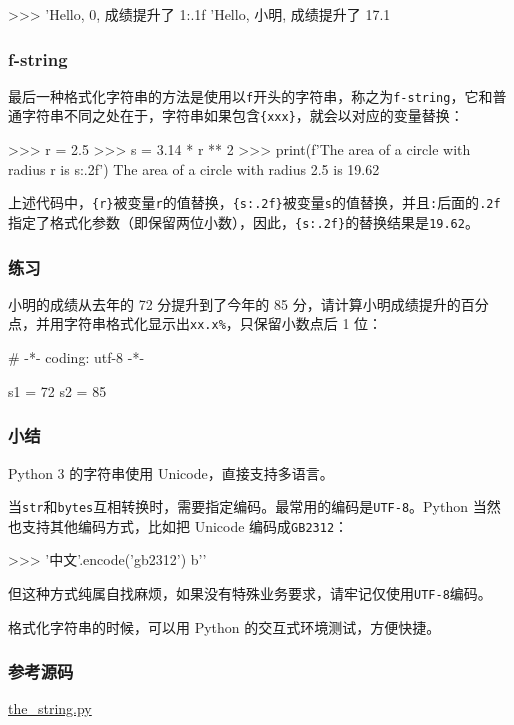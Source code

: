 \begin{pythoncode}
>>> 'Hello, {0}, 成绩提升了 {1:.1f}%
'Hello, 小明, 成绩提升了 17.1%
\end{pythoncode}

\hypertarget{f-string}{%
\subsubsection{f-string}\label{f-string}}

最后一种格式化字符串的方法是使用以\texttt{f}开头的字符串，称之为\texttt{f-string}，它和普通字符串不同之处在于，字符串如果包含\texttt{\{xxx\}}，就会以对应的变量替换：

\begin{pythoncode}
>>> r = 2.5
>>> s = 3.14 * r ** 2
>>> print(f'The area of a circle with radius {r} is {s:.2f}')
The area of a circle with radius 2.5 is 19.62
\end{pythoncode}

上述代码中，\texttt{\{r\}}被变量\texttt{r}的值替换，\texttt{\{s:.2f\}}被变量\texttt{s}的值替换，并且\texttt{:}后面的\texttt{.2f}指定了格式化参数（即保留两位小数），因此，\texttt{\{s:.2f\}}的替换结果是\texttt{19.62}。

\hypertarget{ux7ec3ux4e60}{%
\subsubsection{练习}\label{ux7ec3ux4e60}}

小明的成绩从去年的 72 分提升到了今年的 85
分，请计算小明成绩提升的百分点，并用字符串格式化显示出\texttt{\textquotesingle{}xx.x\%\textquotesingle{}}，只保留小数点后
1 位：

\begin{pythoncode}
# -*- coding: utf-8 -*-

s1 = 72
s2 = 85
\end{pythoncode}

\hypertarget{ux5c0fux7ed3}{%
\subsubsection{小结}\label{ux5c0fux7ed3}}

Python 3 的字符串使用 Unicode，直接支持多语言。

当\texttt{str}和\texttt{bytes}互相转换时，需要指定编码。最常用的编码是\texttt{UTF-8}。Python
当然也支持其他编码方式，比如把 Unicode 编码成\texttt{GB2312}：

\begin{pythoncode}
>>> '中文'.encode('gb2312')
b'\xce{}'
\end{pythoncode}

但这种方式纯属自找麻烦，如果没有特殊业务要求，请牢记仅使用\texttt{UTF-8}编码。

格式化字符串的时候，可以用 Python 的交互式环境测试，方便快捷。

\hypertarget{ux53c2ux8003ux6e90ux7801}{%
\subsubsection{参考源码}\label{ux53c2ux8003ux6e90ux7801}}

\href{https://github.com/michaelliao/learn-python3/blob/master/samples/basic/the_string.py}{the\_string.py}

